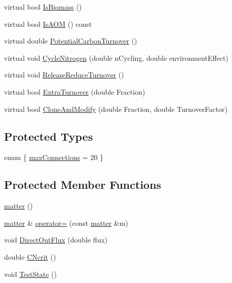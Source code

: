 \begin{DoxyCompactItemize}
\item 
virtual bool \hyperlink{classmatter_af64df31f0243674868c26be217d8decf}{IsBiomass} ()
\item 
virtual bool \hyperlink{classmatter_a838d402c6b41deb9d9c20eeabecd94a8}{IsAOM} () const 
\item 
virtual double \hyperlink{classmatter_ad8531740a6494ac68f0223cd49d272eb}{PotentialCarbonTurnover} ()
\item 
virtual void \hyperlink{classmatter_a2c4adc457cfb867ea5abd7e8a3489c48}{CycleNitrogen} (double nCycling, double environmentEffect)
\item 
virtual void \hyperlink{classmatter_a9fe8f4ee934f280c9964dacc27d42611}{ReleaseReduceTurnover} ()
\item 
virtual bool \hyperlink{classmatter_a3e3b834e7187ad3447eda29a2703377a}{ExtraTurnover} (double Fraction)
\item 
virtual bool \hyperlink{classmatter_a2c91964d566a29807648e62548c6b159}{CloneAndModify} (double Fraction, double TurnoverFactor)
\end{DoxyCompactItemize}
\subsection*{Protected Types}
\begin{DoxyCompactItemize}
\item 
enum \{ \hyperlink{classmatter_a7dbeb62589b018c950f7025b93a2f75ca34d772285f7fb06e6efb36d78b928b93}{maxConnections} = 20
 \}
\end{DoxyCompactItemize}
\subsection*{Protected Member Functions}
\begin{DoxyCompactItemize}
\item 
\hyperlink{classmatter_aadaebd447a949f40f20753ae3b6163a1}{matter} ()
\item 
\hyperlink{classmatter}{matter} \& \hyperlink{classmatter_a7e74962a5eb9280b2a259c9b908ded79}{operator=} (const \hyperlink{classmatter}{matter} \&m)
\item 
void \hyperlink{classmatter_a8d0cc1e4c20dfb20cbb9eceaa4ad7c67}{DirectOutFlux} (double flux)
\item 
double \hyperlink{classmatter_af3b6b437f85e529623fdb3a93adbe4ad}{CNcrit} ()
\item 
void \hyperlink{classmatter_a163ce999b80e53c044fb9d948da510e3}{TestState} ()
\end{DoxyCompactItemize}
